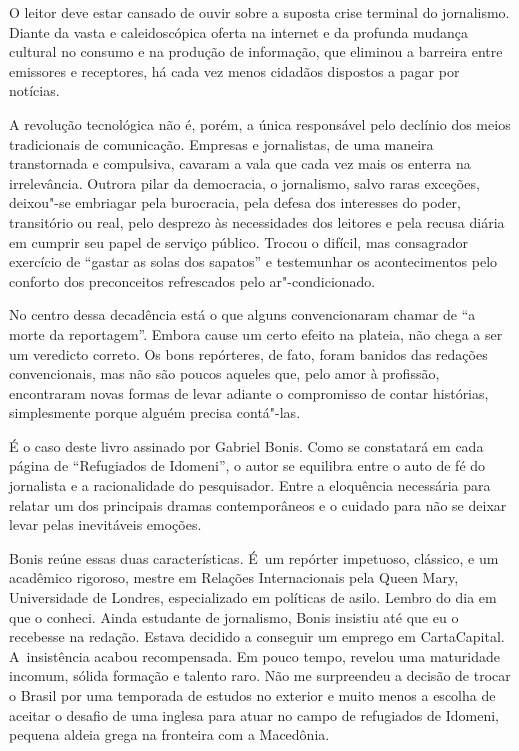  

O leitor deve estar cansado de ouvir sobre a suposta crise terminal do
jornalismo. Diante da vasta e caleidoscópica oferta na internet e da
profunda mudança cultural no consumo e na produção de informação, que
eliminou a barreira entre emissores e receptores, há cada vez menos
cidadãos dispostos a pagar por notícias.

A revolução tecnológica não é, porém, a única responsável pelo declínio
dos meios tradicionais de comunicação. Empresas e jornalistas, de uma
maneira transtornada e compulsiva, cavaram a vala que cada vez mais os
enterra na irrelevância. Outrora pilar da democracia, o jornalismo,
salvo raras exceções, deixou"-se embriagar pela burocracia, pela defesa
dos interesses do poder, transitório ou real, pelo desprezo às
necessidades dos leitores e pela recusa diária em cumprir seu papel de
serviço público. Trocou o difícil, mas consagrador exercício de ``gastar
as solas dos sapatos'' e testemunhar os acontecimentos pelo conforto dos
preconceitos refrescados pelo ar"-condicionado.

No centro dessa decadência está o que alguns convencionaram chamar de
``a morte da reportagem''. Embora cause um certo efeito na plateia, não
chega a ser um veredicto correto. Os bons repórteres, de fato, foram
banidos das redações convencionais, mas não são poucos aqueles que, pelo
amor à profissão, encontraram novas formas de levar adiante o
compromisso de contar histórias, simplesmente porque alguém precisa
contá"-las.

É o caso deste livro assinado por Gabriel Bonis. Como se constatará em
cada página de ``Refugiados de Idomeni'', o autor se equilibra entre o
auto de fé do jornalista e a racionalidade do pesquisador. Entre a
eloquência necessária para relatar um dos principais dramas
contemporâneos e o cuidado para não se deixar levar pelas inevitáveis
emoções.

Bonis reúne essas duas características. É~um repórter impetuoso,
clássico, e um acadêmico rigoroso, mestre em Relações Internacionais
pela Queen Mary, Universidade de Londres, especializado em políticas de
asilo. Lembro do dia em que o conheci. Ainda estudante de jornalismo,
Bonis insistiu até que eu o recebesse na redação. Estava decidido a
conseguir um emprego em CartaCapital. A~insistência acabou recompensada.
Em pouco tempo, revelou uma maturidade incomum, sólida formação e
talento raro. Não me surpreendeu a decisão de trocar o Brasil por uma
temporada de estudos no exterior e muito menos a escolha de aceitar o
desafio de uma  inglesa para atuar no campo de refugiados de Idomeni,
pequena aldeia grega na fronteira com a Macedônia.

